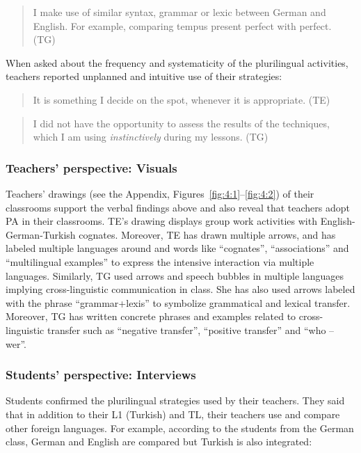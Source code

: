 \documentclass[output=paper]{../langscibook}
\begin{document}
\begin{quote}
I make use of similar syntax, grammar or lexic between German and English. For example, comparing tempus present perfect with perfect. (TG) 
\end{quote}

\noindent When asked about the frequency and systematicity of the plurilingual activities, teachers reported unplanned and intuitive use of their strategies:

\begin{quote}
It is something I decide on the spot, whenever it is appropriate. (TE) 
\end{quote}

\begin{quote}
I did not have the opportunity to assess the results of the techniques, which I am using \emph{instinctively} during my lessons. (TG)
\end{quote}


\subsubsection{Teachers’ perspective: Visuals}


Teachers’ drawings (see the Appendix, Figures~\ref{fig:4:1}--\ref{fig:4:2}) of their classrooms support the verbal findings above and also reveal that teachers adopt PA in their classrooms. TE’s drawing displays group work activities with English-German-Turkish cognates. Moreover, TE has drawn multiple arrows, and has labeled multiple languages around and words like “cognates”, “associations” and “multilingual examples” to express the intensive interaction via multiple languages. Similarly, TG used arrows and speech bubbles in multiple languages implying cross-linguistic communication in class.  She has also used arrows labeled with the phrase “grammar+lexis” to symbolize grammatical and lexical transfer. Moreover, TG has written concrete phrases and examples related to cross-linguistic transfer such as “negative transfer”, “positive transfer” and “who – wer”.


\subsubsection{Students’ perspective: Interviews}


Students confirmed the plurilingual strategies used by their teachers. They said that in addition to their L1 (Turkish) and TL, their teachers use and compare other foreign languages. For example, according to the students from the German class, German and English are compared but Turkish is also integrated:
\end{document}
